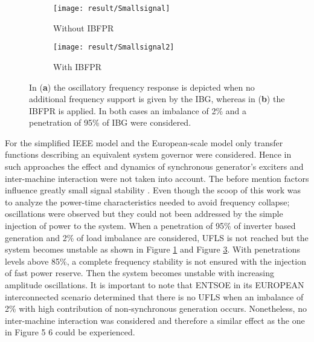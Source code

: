\begin{figure}[h]
	\centering
	\begin{subfigure}[h]{0.49\textwidth}
		\centering
		\texttt{[image: result/Smallsignal]}
		\caption{Without IBFPR}
		\label{fig:res_osc_noIBFPR}
	\end{subfigure}
	\hfill
	\begin{subfigure}[h]{0.49\textwidth}
		\centering
		\texttt{[image: result/Smallsignal2]}
		\caption{With IBFPR}
		\label{fig:res_osc_IBFPR}
	\end{subfigure}
	
	
	\caption{In (\textbf{a}) the oscillatory frequency response is depicted when no additional frequency support is given by the IBG, whereas in  (\textbf{b}) the IBFPR is applied. In both cases an imbalance of 2\% and a penetration of 95\% of IBG were considered.}
\end{figure}


For the simplified IEEE model and the European-scale model only transfer functions describing an equivalent system governor were considered. Hence in such approaches the effect and dynamics of synchronous generator’s exciters and inter-machine interaction were not taken into account. The before mention factors influence greatly small signal stability \cite{kundur1994power, Anderson.2002}. Even though the scoop of this work was to analyze the power-time characteristics needed to avoid frequency collapse; oscillations were observed but they could not been addressed by the simple injection of power to the system. When a penetration of 95\% of inverter based generation and 2\% of load imbalance are considered, UFLS is not reached but the system becomes unstable as shown in Figure \ref{fig:res_osc_noIBFPR} and Figure \ref{fig:res_osc_IBFPR}. With penetrations levels above 85\%, a complete frequency stability is not ensured with the injection of fast power reserve. Then the system becomes unstable with increasing amplitude oscillations. It is important to note that ENTSOE in its EUROPEAN interconnected scenario determined that there is no UFLS when an imbalance of 2\% with high contribution of non-synchronous generation occurs. Nonetheless, no inter-machine interaction was considered and therefore a similar effect as the one in Figure 5 6 could be experienced.

